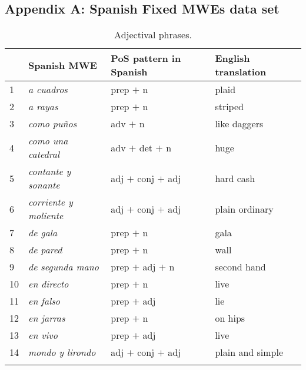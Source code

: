 \documentclass[output=paper]{langsci/langscibook}
\begin{document}
\subsection{Appendix A: Spanish Fixed MWEs data set}
\label{sec:appendixA_fixedMWEs}

\begin{table}[H]
\centering
\caption{Adjectival phrases.}
\label{tab:adjPhrases-fixed}
\begin{tabular}{l|lll}
\lsptoprule
\textbf{} & \textbf{Spanish MWE} & \textbf{PoS pattern in Spanish} & \textbf{English translation} \\ 
\midrule
1 & \textit{a cuadros} & prep $+$ n & plaid \\
2 & \textit{a rayas} & prep $+$ n & striped \\
3 & \textit{como puños} & adv $+$ n & like daggers \\
4 & \textit{como una catedral} & adv $+$ det $+$ n & huge \\
5 & \textit{contante y sonante} & adj $+$ conj $+$ adj & hard cash \\
6 & \textit{corriente y moliente} & adj $+$ conj $+$ adj & plain ordinary \\
7 & \textit{de gala} & prep $+$ n & gala \\
8 & \textit{de pared} & prep $+$ n & wall \\
9 & \textit{de segunda mano} & prep $+$ adj $+$ n & second hand \\
10 & \textit{en directo} & prep $+$ n & live \\
11 & \textit{en falso} & prep $+$ adj & lie \\
12 & \textit{en jarras} & prep $+$ n & on hips \\
13 & \textit{en vivo} & prep $+$ adj & live \\
14 & \textit{mondo y lirondo} & adj $+$ conj $+$ adj & plain and simple \\
\lspbottomrule
\end{tabular}
\end{table}
\end{document}
